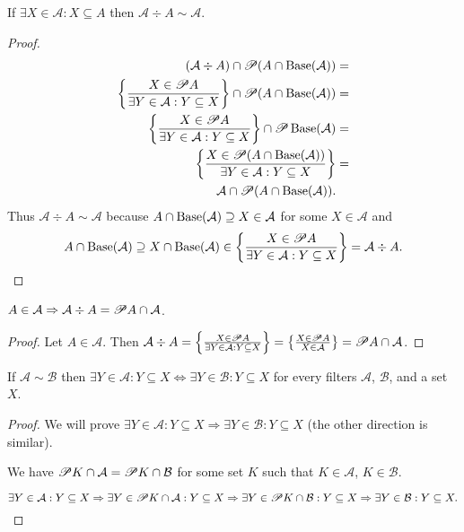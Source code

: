 \begin{prop}
If $\exists X\in\mathcal{A}:X\subseteq A$ then $\mathcal{A}\div A\sim\mathcal{A}$.
\end{prop}
\begin{proof}
~
\begin{align*}
(\mathcal{A}\div A)\cap\mathscr{P}(A\cap\operatorname{Base}(\mathcal{A})) & =\\
\left\{ \frac{X\in\mathscr{P} A}{\exists Y\in\mathcal{A}:Y\subseteq X}\right\}\cap\mathscr{P}(A\cap\operatorname{Base}(\mathcal{A})) & =\\
\left\{ \frac{X\in\mathscr{P} A}{\exists Y\in\mathcal{A}:Y\subseteq X}\right\}\cap\mathscr{P}\operatorname{Base}(\mathcal{A}) & =\\
\left\{ \frac{X\in\mathscr{P}(A\cap\operatorname{Base}(\mathcal{A}))}{\exists Y\in\mathcal{A}:Y\subseteq X}\right\} & =\\
\mathcal{A}\cap\mathscr{P}(A\cap\operatorname{Base}(\mathcal{A})).
\end{align*}
Thus $\mathcal{A}\div A\sim\mathcal{A}$ because $A\cap\operatorname{Base}(\mathcal{A})\supseteq X\in\mathcal{A}$
for some $X\in\mathcal{A}$ and 
\[
A\cap\operatorname{Base}(\mathcal{A})\supseteq X\cap\operatorname{Base}(\mathcal{A})\in\left\{ \frac{X\in\mathscr{P} A}{\exists Y\in\mathcal{A}:Y\subseteq X}\right\}=\mathcal{A}\div A.
\]
\end{proof}
\begin{prop}
$A\in\mathcal{A}\Rightarrow\mathcal{A}\div A=\mathscr{P} A\cap\mathcal{A}$.\end{prop}
\begin{proof}
Let $A\in\mathcal{A}$. Then $\mathcal{A}\div A=\left\{ \frac{X\in\mathscr{P} A}{\exists Y\in\mathcal{A}:Y\subseteq X}\right\}=\left\{ \frac{X\in\mathscr{P} A}{X\in\mathcal{A}}\right\}=\mathscr{P}A\cap\mathcal{A}$.\end{proof}
\begin{lem}
If $\mathcal{A}\sim\mathcal{B}$ then $\exists Y\in\mathcal{A}:Y\subseteq X\Leftrightarrow\exists Y\in\mathcal{B}:Y\subseteq X$
for every filters $\mathcal{A}$, $\mathcal{B}$, and a set $X$.\end{lem}
\begin{proof}
We will prove $\exists Y\in\mathcal{A}:Y\subseteq X\Rightarrow\exists Y\in\mathcal{B}:Y\subseteq X$
(the other direction is similar).

We have $\mathscr{P} K\cap\mathcal{A}=\mathscr{P} K\cap\mathcal{B}$ for
some set $K$ such that $K\in\mathcal{A}$, $K\in\mathcal{B}$.

\[
\exists Y\in\mathcal{A}:Y\subseteq X\Rightarrow\exists Y\in\mathscr{P} K\cap\mathcal{A}:Y\subseteq X\Rightarrow\exists Y\in\mathscr{P} K\cap\mathcal{B}:Y\subseteq X\Rightarrow\exists Y\in\mathcal{B}:Y\subseteq X.
\]
\end{proof}
